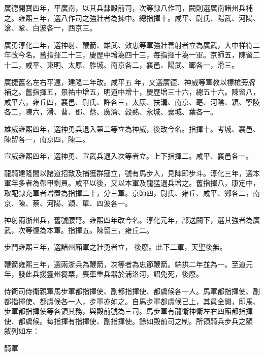 \begin{pinyinscope}
 廣德開寶四年，平廣南，以其兵隸殿前司，次等隸八作司，闕則選廣南諸州兵補之。雍熙三年，選八作司之強壯者為揀中。總指揮十。咸平、尉氏、陽武、河陽、滄、鞏、白波各一，西京三。



 廣勇淳化二年，選神射、鞭箭、雄武、效忠等軍強壯善射者立為廣武，大中祥符二年改今名。舊指揮二十三，慶歷中增為四十三，每指揮十為一軍。京師五，陳留二十二，咸平、東明、太原、胙城、南京各二，襄邑、陽武、鄆各一，滑三。



 廣捷舊名左右平遠，建隆二年改。咸平五
 年，又選廣德、神威等軍教以標槍旁牌補之。舊指揮五，景祐中增五，明道中增十，慶歷增三十六，總五十六。陳留八，咸平六，雍丘四，襄邑、尉氏、許各三，太康、扶溝、南京、亳、河陰、穎、寧陵各二，陳六，滑、曹、鄧、蔡、廣濟、穀熟、永城、襄城、葉各一。



 雄威雍熙四年，選神勇兵退入第二等立為神威，後改今名。指揮十。考城、襄邑、陳留各一，南京四，陳二。



 宣威雍熙四年，選神勇、宣武兵退入次等者立。上下指揮二。咸平、襄邑各一。



 龍騎建隆間以諸道招致及捕獲群寇立，號有馬步人，見陣即步斗。淳化三年，選本軍年多者為帶甲剩員。咸平以後，又以本軍及龍猛退兵增之。舊指揮八，康定中，取配隸充軍者增置為指揮二十，分三軍。京師四，尉氏、雍丘、咸平、鄭各二，南京、陳、蔡、河陽、穎、單、四波各一。



 神射兩浙州兵，舊號腰弩。雍熙四年改今名。淳化元年，部送闕下，選其強者為廣武，次等復為本軍。指揮五。陳留三，雍丘二。



 步鬥雍熙三年，選諸州廂軍之壯勇者立，
 後廢。此下二軍，天聖後無。



 鞭箭雍熙三年，選兩浙兵為鞭箭，次等者為忠節鞭箭。端拱二年並為一。至道元年，發此兵援靈州芻粟，喪車重兵器於浦洛河，詔免死，後廢。



 侍衛司侍衛親軍馬步軍都指揮使、副都指揮使、都虞候各一人。馬軍都指揮使、副都指揮使、都虞候各一人，步軍亦如之。自馬步軍都虞候已上，其員全闕，即馬、步軍都指揮使等各領其務，與殿前號為三司。馬步軍有龍衛神衛左右四廂都指揮使、都虞候。每指揮有指揮使、副指揮使。餘如殿前司之制。所領騎兵步兵之額
 敘列如左：



 騎軍




\end{pinyinscope}
